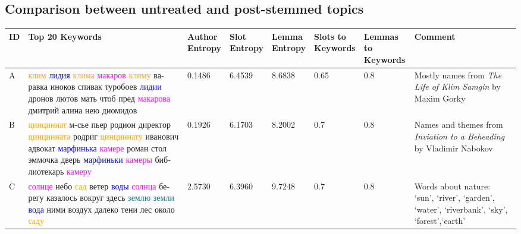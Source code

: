 \documentclass[11pt,a4paper]{article}
\begin{document}
\begin{landscape}
\section{Comparison between untreated and post-stemmed topics}
    \label{table:sample_original_topics}
\label{sec:sample_original_topics}
\begin{center}
    \nopagebreak[4]
    \begin{tabularx}{\textwidth}{|l|X|l|l|l|l|l|X|}
    \hline
    \textbf{ID} & \textbf{Top 20 Keywords} & \thead{\textbf{Author}\\\textbf{Entropy}} & \thead{\textbf{Slot}\\\textbf{Entropy}} & \thead{\textbf{Lemma}\\\textbf{Entropy}} & \thead{\textbf{Slots to}\\\textbf{Keywords}} & \thead{\textbf{Lemmas to}\\\textbf{Keywords}} & \textbf{Comment} \\ \hline
    A & \foreignlanguage{russian}{\textcolor{orange}{клим} \textcolor{blue}{лидия} \textcolor{orange}{клима} \textcolor{magenta}{макаров} \textcolor{orange}{климу} варавка иноков спивак туробоев \textcolor{blue}{лидии} дронов лютов мать чтоб пред \textcolor{magenta}{макарова} дмитрий алина нею диомидов} & 0.1486 & 6.4539 & 8.6838 & 0.65 & 0.8 & Mostly names from \textit{The Life of Klim Samgin} by Maxim Gorky \\ \hline
    B & \foreignlanguage{russian}{\textcolor{orange}{цинциннат} м-сье пьер родион директор \textcolor{orange}{цинцинната} родриг \textcolor{orange}{цинциннату} иванович адвокат \textcolor{blue}{марфинька} \textcolor{magenta}{камере} роман стол эммочка дверь \textcolor{blue}{марфиньки} \textcolor{magenta}{камеры} библиотекарь \textcolor{magenta}{камеру}} &  0.1926 & 6.1703 & 8.2002 & 0.7 & 0.8 & Names and themes from \textit{Inviation to a Beheading} by Vladimir Nabokov\\ \hline
    C & \foreignlanguage{russian}{\textcolor{magenta}{солнце} небо \textcolor{orange}{сад} ветер \textcolor{blue}{воды} \textcolor{magenta}{солнца} берегу казалось вокруг здесь \textcolor{teal}{землю земли} \textcolor{blue}{вода} ними воздух далеко тени лес около \textcolor{orange}{саду}} & 2.5730 & 6.3960 & 9.7248 & 0.7 & 0.8 &  Words about nature: `sun', `river', `garden', `water', `riverbank', `sky', `forest',`earth'\\ \hline

\end{tabularx}
\end{center}
\end{landscape}
\end{document}
